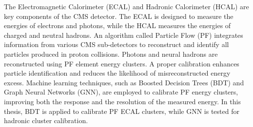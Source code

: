 
The Electromagnetic Calorimeter (ECAL) and Hadronic Calorimeter (HCAL) are key components of the CMS detector.
The ECAL is designed to measure the energies of electrons and photons, while the HCAL measures the energies of charged and neutral hadrons.
An algorithm called Particle Flow (PF) integrates information from various CMS sub-detectors to reconstruct and identify all particles produced in proton collisions.
Photons and neural hadrons are reconstructed using PF element energy clusters.
A proper calibration enhances particle identification and reduces the likelihood of misreconstructed energy excess.
Machine learning techniques, such as Boosted Decision Trees (BDT) and Graph Neural Networks (GNN), are employed to calibrate PF energy clusters, improving both the response and the resolution of the measured energy. 
In this thesis, BDT is applied to calibrate PF ECAL clusters, while GNN is tested for hadronic cluster calibration. %





